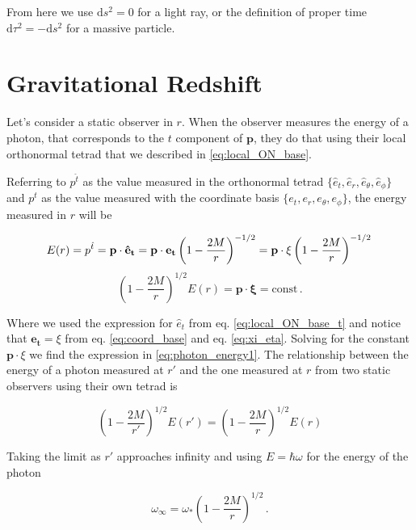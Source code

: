 From here we use $\mathrm{d}s^2 = 0$ for a light ray, or the definition of
proper time $\mathrm{d}\tau^2 = - \mathrm{d}s^2$ for a massive particle.

\section{Gravitational Redshift}

Let's consider a static observer in $r$.
When the observer measures the energy of a photon, that corresponds to the $t$
component of $\mathbf{p}$, they do that using their local orthonormal tetrad
that we described in \ref{eq:local_ON_base}.

Referring to $p^{\hat t}$ as the value measured in the orthonormal tetrad
$\{\hat e_t, \hat e_r, \hat e_\theta, \hat e_\phi \}$ and
$p^t$ as the value measured with the coordinate basis
$\{e_{t}, e_{r}, e_{\theta}, e_{\phi} \}$, the energy measured in $r$ will be

\begin{equation*}
    E(r) = p^{\hat t} = \mathbf{p \cdot \hat e_t}
    = \mathbf{p \cdot e_t} \left(1 - \frac{2M}{r} \right)^{-1/2}
    = \mathbf{p \cdot \xi} \left(1 - \frac{2M}{r} \right)^{-1/2} \\
\end{equation*}
\begin{equation}
    \left(1 - \frac{2M}{r} \right)^{1/2} E(r) = \mathbf{p \cdot \xi}
    = \text{const} \, .
    \label{eq:photon_energy1}
\end{equation}

Where we used the expression for $\hat e_t$ from eq. \ref{eq:local_ON_base_t}
and notice that $\mathbf{e_t} = \xi$ from eq. \ref{eq:coord_base} and eq.
\ref{eq:xi_eta}. 
Solving for the constant $\mathbf{p} \cdot \xi$ we find the expression in
\ref{eq:photon_energy1}. The relationship between the energy of a photon
measured at $r'$ and the one measured at $r$ from two static observers using
their own tetrad is

\begin{equation*}
    \left(1 - \frac{2M}{r'} \right)^{1/2} E(r')
    = \left(1 - \frac{2M}{r} \right)^{1/2} E(r)
\end{equation*}

Taking the limit as $r'$ approaches infinity and using $E = \hbar \omega$ for
the energy of the photon

\begin{equation*}
    \omega_\infty = \omega_* \left(1 - \frac{2M}{r} \right)^{1/2} \, .
    \label{eq:redshift}
\end{equation*}

